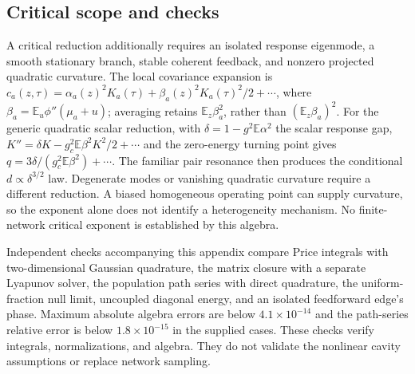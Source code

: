 \subsection{Critical scope and checks}

A critical reduction additionally requires an isolated response eigenmode,
a smooth stationary branch, stable coherent feedback, and nonzero projected
quadratic curvature. The local covariance expansion is
$c_a(z,\tau)=\alpha_a(z)^2K_a(\tau)+\beta_a(z)^2K_a(\tau)^2/2+\cdots$,
where $\beta_a=\mathbb E_u\phi''(\mu_a+u)$; averaging retains
$\mathbb E_z\beta_a^2$, rather than $(\mathbb E_z\beta_a)^2$.
For the generic quadratic scalar reduction, with
$\delta=1-g^2\mathbb E\alpha^2$ the scalar response gap,
$K''=\delta K-g_c^2\mathbb E\beta^2 K^2/2+\cdots$ and the zero-energy
turning point gives $q=3\delta/(g_c^2\mathbb E\beta^2)+\cdots$.
The familiar pair resonance then produces the conditional $d\propto
\delta^{3/2}$ law. Degenerate modes or vanishing quadratic curvature require
a different reduction. A biased homogeneous operating point can supply
curvature, so the exponent alone does not identify a heterogeneity mechanism.
No finite-network critical exponent is established by this algebra.

Independent checks accompanying this appendix compare Price integrals with
two-dimensional Gaussian quadrature, the matrix closure with a separate
Lyapunov solver, the population path series with direct quadrature, the
uniform-fraction null limit, uncoupled diagonal energy, and an isolated
feedforward edge's phase. Maximum absolute algebra errors are below
$4.1\times10^{-14}$ and the path-series relative error is below
$1.8\times10^{-15}$ in the supplied cases. These checks verify integrals,
normalizations, and algebra. They do not validate the nonlinear cavity
assumptions or replace network sampling.
